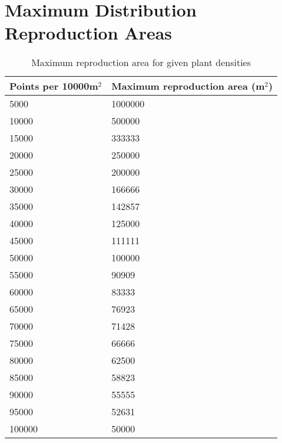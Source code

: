 \chapter{Maximum Distribution Reproduction Areas} \label{AppendixC}

\begin{table}[]
  \centering
	    \begin{tabular}{|p{7cm}|p{8cm}|}
		\hline
		\textbf{Points per 10000m$^{2}$} & \textbf{Maximum reproduction area (m$^{2}$)}\\
		\hline
		5000	  &  1000000\\
		\hline
		10000	  &  500000\\
		\hline
		15000 &	333333\\
		\hline
		20000 &	250000\\
		\hline
		25000 &	200000\\
		\hline
		30000 &	166666\\
		\hline
		35000 &	142857\\
		\hline
		40000 &	125000\\
		\hline
		45000 &	111111\\
		\hline
		50000 &	100000\\
		\hline
		55000 &	90909\\
		\hline
		60000 &	83333\\
		\hline
		65000 &	76923\\
		\hline
		70000 &	71428\\
		\hline
		75000 &	66666\\
		\hline
		80000 &	62500\\
		\hline
		85000 &	58823\\
		\hline
		90000 &	55555\\
		\hline
		95000 &	52631\\
		\hline
		100000 & 50000\\
		\hline
		\end{tabular}
		\caption{Maximum reproduction area for given plant densities}
	  \label{tab:maximum_reproduction_areas}
\end{table}